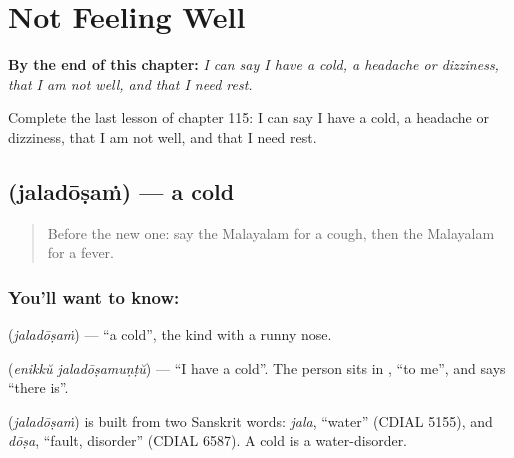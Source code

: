 
\chapter{Not Feeling Well}
\label{ch:ml-not-feeling-well}

\begin{chapteropening}
\textbf{By the end of this chapter:} \emph{I can say I have a cold, a headache or dizziness, that I am not well, and that I need rest.}

Complete the last lesson of chapter 115: I can say I have a cold, a headache or dizziness, that I am not well, and that I need rest.
\end{chapteropening}

\section[\texorpdfstring{\ml{ജലദോഷം} (jaladōṣaṁ)}{ജലദോഷം (jaladōṣaṁ)}]{ (jaladōṣaṁ) — a cold}

\label{lesson:ML-C115-cold}



\begin{quote}
Before the new one: say the Malayalam for a cough, then the Malayalam for a fever.
\end{quote}

\subsection*{You'll want to know: }
\textbf{} (\emph{jaladōṣaṁ}) — \textquotedblleft{}a cold\textquotedblright{}, the kind with a runny nose.

\textbf{ } (\emph{enikkŭ jaladōṣamuṇṭŭ}) — \textquotedblleft{}I have a cold\textquotedblright{}. The person sits in \textbf{}, \textquotedblleft{}to me\textquotedblright{}, and \textbf{} says \textquotedblleft{}there is\textquotedblright{}.

\begin{cousinweb}
\textbf{} (\emph{jaladōṣaṁ}) is built from two Sanskrit words: \emph{jala}, \textquotedblleft{}water\textquotedblright{} (CDIAL 5155), and \emph{dōṣa}, \textquotedblleft{}fault, disorder\textquotedblright{} (CDIAL 6587). A cold is a water-disorder.
\end{cousinweb}

